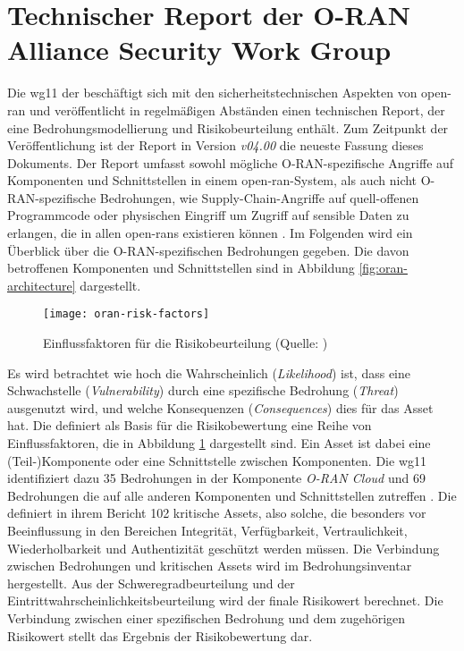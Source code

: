 \section{Technischer Report der O-RAN Alliance Security Work Group}
\label{sec:forschungsstand-wg11}
Die \gls{wg11} der \orana{} beschäftigt sich mit den sicherheitstechnischen Aspekten von \gls{open-ran} und veröffentlicht in regelmäßigen Abständen einen technischen Report, der eine Bedrohungsmodellierung und Risikobeurteilung enthält. Zum Zeitpunkt der Veröffentlichung ist der Report in Version \textit{\textsf{v04.00}} die neueste Fassung dieses Dokuments. Der Report umfasst sowohl mögliche O-RAN-spezifische Angriffe auf Komponenten und Schnittstellen in einem \gls{open-ran}-System, als auch nicht O-RAN-spezifische Bedrohungen, wie Supply-Chain-Angriffe auf quell-offenen Programmcode oder physischen Eingriff um Zugriff auf sensible Daten zu erlangen, die in allen \glspl{open-ran} existieren können \autocite{o-ranworkgroup11securityworkgroupORANSecurityThreat2024}. Im Folgenden wird ein Überblick über die O-RAN-spezifischen Bedrohungen gegeben. Die davon betroffenen Komponenten und Schnittstellen sind in Abbildung \ref{fig:oran-architecture} dargestellt.
\begin{figure}
    \centering
    \texttt{[image: oran-risk-factors]}
    \caption{Einflussfaktoren für die Risikobeurteilung (Quelle: \autocite{o-ranworkgroup11securityworkgroupORANSecurityThreat2024})}
    \label{fig:oran-risk-factors}
\end{figure}
\par Es wird betrachtet wie hoch die Wahrscheinlich (\textit{Likelihood}) ist, dass eine Schwachstelle (\textit{Vulnerability}) durch eine spezifische Bedrohung (\textit{Threat}) ausgenutzt wird, und welche Konsequenzen (\textit{Consequences}) dies für das Asset hat. Die \orana{} definiert als Basis für die Risikobewertung eine Reihe von Einflussfaktoren, die in Abbildung \ref{fig:oran-risk-factors} dargestellt sind. Ein Asset ist dabei eine (Teil-)Komponente oder eine Schnittstelle zwischen Komponenten. Die \gls{wg11} identifiziert dazu 35 Bedrohungen in der Komponente \textit{O-RAN Cloud} und 69 Bedrohungen die auf alle anderen Komponenten und Schnittstellen zutreffen \autocite{o-ranworkgroup11securityworkgroupORANSecurityThreat2024}. Die \orana{} definiert in ihrem Bericht 102 kritische Assets, also solche, die besonders vor Beeinflussung in den Bereichen Integrität, Verfügbarkeit, Vertraulichkeit, Wiederholbarkeit und Authentizität geschützt werden müssen. Die Verbindung zwischen Bedrohungen und kritischen Assets wird im Bedrohungsinventar hergestellt. Aus der Schweregradbeurteilung und der Eintrittwahrscheinlichkeitsbeurteilung wird der finale Risikowert berechnet. Die Verbindung zwischen einer spezifischen Bedrohung und dem zugehörigen Risikowert stellt das Ergebnis der Risikobewertung dar.

